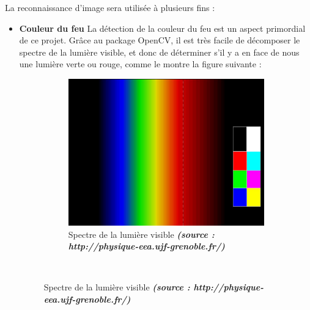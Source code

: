 			La reconnaissance d'image sera utilisée à plusieurs fins :
			\begin{itemize}
				\item \textbf{Couleur du feu}
					La détection de la couleur du feu est un aspect primordial de ce projet. Grâce au package OpenCV, il est très facile de décomposer le spectre de la lumière visible, et donc de déterminer s'il y a en face de nous une lumière verte ou rouge, comme le montre la figure suivante :
					\begin{figure}[H]
					    \centering
					    \begin{subfigure}[h]{0.5\textwidth}
					        \includegraphics[width=\textwidth]{Graphics/opencvEtalon.jpg}
					        \caption{Spectre de la lumière visible \textit{\textbf{(source : http://physique-eea.ujf-grenoble.fr/)}}}
					    \end{subfigure}\\


\end{figure}
\end{itemize}
